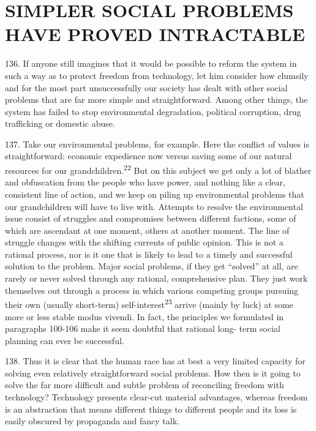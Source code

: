 \documentclass{article}
\begin{document}
\section{SIMPLER SOCIAL PROBLEMS HAVE PROVED INTRACTABLE}

\hspace{0.5cm} 136. If anyone still imagines that it would be possible to reform the system in such a way as to 
protect freedom from technology, let him consider how clumsily and for the most part 
unsuccessfully our society has dealt with other social problems that are far more simple and
straightforward. Among other things, the system has failed to stop environmental degradation, 
political corruption, drug trafficking or domestic abuse. \vspace{\baselineskip}

137. Take our environmental problems, for example. Here the conflict of values is 
straightforward: economic expedience now versus saving some of our natural resources for our 
grandchildren.\textsuperscript{22} But on this subject we get only a lot of blather and obfuscation from the people 
who have power, and nothing like a clear, consistent line of action, and we keep on piling up 
environmental problems that our grandchildren will have to live with. Attempts to resolve the 
environmental issue consist of struggles and compromises between different factions, some of 
which are ascendant at one moment, others at another moment. The line of struggle changes with 
the shifting currents of public opinion. This is not a rational process, nor is it one that is likely to 
lead to a timely and successful solution to the problem. Major social problems, if they get “solved” 
at all, are rarely or never solved through any rational, comprehensive plan. They just work 
themselves out through a process in which various competing groups pursuing their own (usually 
short-term) self-interest\textsuperscript{23} arrive (mainly by luck) at some more or less stable modus vivendi. In 
fact, the principles we formulated in paragraphs 100-106 make it seem doubtful that rational long-
term social planning can ever be successful. \vspace{\baselineskip}

138. Thus it is clear that the human race has at best a very limited capacity for solving even 
relatively straightforward social problems. How then is it going to solve the far more difficult and 
subtle problem of reconciling freedom with technology? Technology presents clear-cut material 
advantages, whereas freedom is an abstraction that means different things to different people and 
its loss is easily obscured by propaganda and fancy talk. \vspace{\baselineskip}
\end{document}
